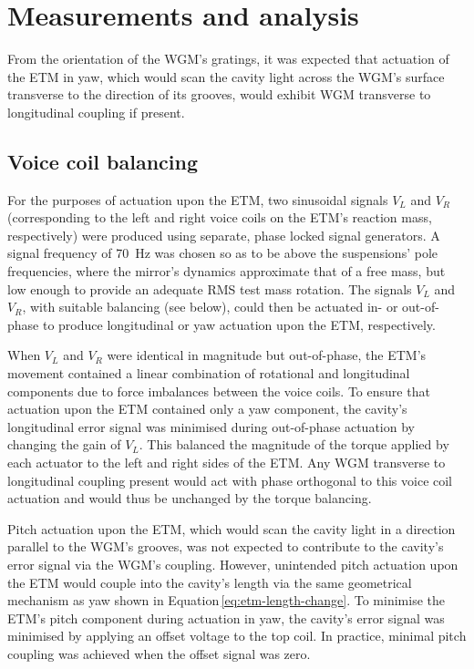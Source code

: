 \section{\label{sec:measurements}Measurements and analysis}

From the orientation of the \gls{WGM}'s gratings, it was expected that actuation of the \gls{ETM} in yaw, which would scan the cavity light across the \gls{WGM}'s surface transverse to the direction of its grooves, would exhibit \gls{WGM} transverse to longitudinal coupling if present.

\subsection{Voice coil balancing}
For the purposes of actuation upon the \gls{ETM}, two sinusoidal signals $V_L$ and $V_R$ (corresponding to the left and right voice coils on the \gls{ETM}'s reaction mass, respectively) were produced using separate, phase locked signal generators. A signal frequency of \SI{70}{\hertz} was chosen so as to be above the suspensions' pole frequencies, where the mirror's dynamics approximate that of a free mass, but low enough to provide an adequate \gls{RMS} test mass rotation. The signals $V_L$ and $V_R$, with suitable balancing (see below), could then be actuated in- or out-of-phase to produce longitudinal or yaw actuation upon the \gls{ETM}, respectively.

When $V_L$ and $V_R$ were identical in magnitude but out-of-phase, the \gls{ETM}'s movement contained a linear combination of rotational and longitudinal components due to force imbalances between the voice coils. To ensure that actuation upon the \gls{ETM} contained only a yaw component, the cavity's longitudinal error signal was minimised during out-of-phase actuation by changing the gain of $V_L$. This balanced the magnitude of the torque applied by each actuator to the left and right sides of the \gls{ETM}. Any \gls{WGM} transverse to longitudinal coupling present would act with phase orthogonal to this voice coil actuation and would thus be unchanged by the torque balancing.

Pitch actuation upon the \gls{ETM}, which would scan the cavity light in a direction parallel to the \gls{WGM}'s grooves, was not expected to contribute to the cavity's error signal via the \gls{WGM}'s coupling. However, unintended pitch actuation upon the \gls{ETM} would couple into the cavity's length via the same geometrical mechanism as yaw shown in Equation\,\ref{eq:etm-length-change}. To minimise the \gls{ETM}'s pitch component during actuation in yaw, the cavity's error signal was minimised by applying an offset voltage to the top coil. In practice, minimal pitch coupling was achieved when the offset signal was zero.

